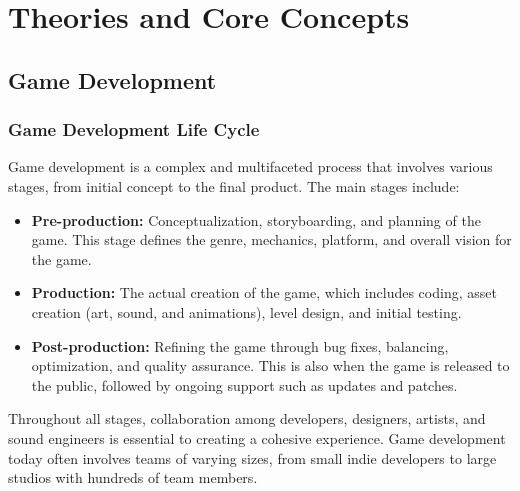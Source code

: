 \documentclass[12pt,oneside,openright,a4paper]{cpe-english-project}
\begin{document}

\section{Theories and Core Concepts}
\subsection{Game Development}
\subsubsection{Game Development Life Cycle}
Game development is a complex and multifaceted process that involves various stages, from initial concept to the final product. The main stages include:
\begin{itemize}
\item  \textbf{Pre-production:} Conceptualization, storyboarding, and planning of the game. This stage defines the genre, mechanics, platform, and overall vision for the game.
\item  \textbf{Production:} The actual creation of the game, which includes coding, asset creation (art, sound, and animations), level design, and initial testing.
\item  \textbf{Post-production:} Refining the game through bug fixes, balancing, optimization, and quality assurance. This is also when the game is released to the public, followed by ongoing support such as updates and patches.
\end{itemize}
Throughout all stages, collaboration among developers, designers, artists, and sound engineers is essential to creating a cohesive experience. Game development today often involves teams of varying sizes, from small indie developers to large studios with hundreds of team members.
\end{document}
